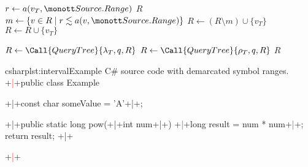 \documentclass[../thesis]{subfiles}
\begin{document}
\begin{algorithm}
	\small
	\tikzexternaldisable

	\caption{Efficiently associating \gls{lsp}-returned \glspl{range} to existing elements using an already constructed augmented \gls{intervaltree}.}\label{alg:interval}
	\begin{algorithmic}[1]
		\State \Return {}
		\EndFunction

		\Statex
		\State $r \gets a(v_T, \tt{Source.Range})$
		\State \Return $R$
		\EndIf
		\State $m \gets \{v \in R \mid r \lesssim a(v, \tt{Source.Range}) \}$
		 
		\State $R \gets (R \setminus m) \cup \{v_T\}$
		 
		\State $R \gets R \cup \{v_T\}$
		\EndIf
		\EndIf

		\State $R \gets \Call{QueryTree}{\lambda_T, q, R}$
		 
		\State $R \gets \Call{QueryTree}{\rho_T, q, R}$
		\EndIf
		\State \Return $R$
		\EndFunction
	\end{algorithmic}
	\tikzexternalenable
\end{algorithm}

\begin{codebox}[minted options={linenos,escapeinside=++,firstnumber=0}]{csharp}{lst:interval}{Example C\# source code with demarcated symbol ranges.}
+\textcolor{red}{|}+public class Example {
  +\textcolor{Emerald}{|}+const char someValue = 'A'+\textcolor{Emerald}{|}+;

  +\textcolor{Peach}{|}+public static long pow(+\textcolor{OliveGreen}{|}+int num+\textcolor{OliveGreen}{|}+) {
    +\textcolor{Brown}{|}+long result = num * num+\textcolor{Brown}{|}+;
    return result;
  }+\textcolor{Peach}{|}+
}+\textcolor{red}{|}+
\end{codebox}
\end{document}
